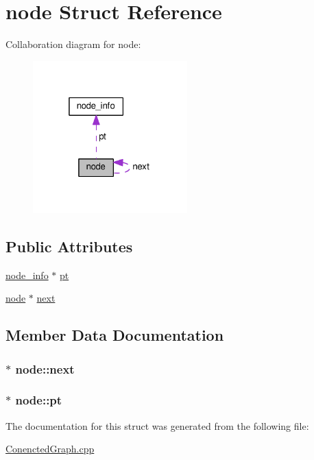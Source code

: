 \hypertarget{structnode}{}\section{node Struct Reference}
\label{structnode}


Collaboration diagram for node\+:
\nopagebreak
\begin{figure}[H]
\begin{center}
\leavevmode
\includegraphics[width=169pt]{structnode__coll__graph}
\end{center}
\end{figure}
\subsection*{Public Attributes}
\begin{DoxyCompactItemize}
\item 
\hyperlink{structnode__info}{node\+\_\+info} $\ast$ \hyperlink{structnode_ad5d98c32ab86154ae188cbdd5dca64a3}{pt}
\item 
\hyperlink{structnode}{node} $\ast$ \hyperlink{structnode_aad210fa7c160a49f6b9a3ffee592a2bc}{next}
\end{DoxyCompactItemize}


\subsection{Member Data Documentation}
\subsubsection[{\texorpdfstring{next}{next}}]{$\ast$ node\+::next}\hypertarget{structnode_aad210fa7c160a49f6b9a3ffee592a2bc}{}\label{structnode_aad210fa7c160a49f6b9a3ffee592a2bc}
\subsubsection[{\texorpdfstring{pt}{pt}}]{$\ast$ node\+::pt}\hypertarget{structnode_ad5d98c32ab86154ae188cbdd5dca64a3}{}\label{structnode_ad5d98c32ab86154ae188cbdd5dca64a3}


The documentation for this struct was generated from the following file\+:\begin{DoxyCompactItemize}
\item 
\hyperlink{ConenctedGraph_8cpp}{Conencted\+Graph.\+cpp}\end{DoxyCompactItemize}
